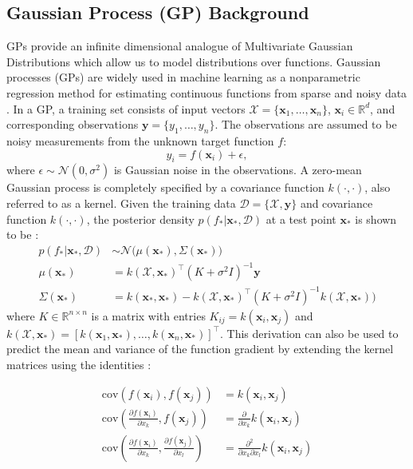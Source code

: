 \documentclass[letterpaper, 10 pt, conference]{ieeeconf}  %
\newcommand{\by}{\mathbf{y}}
\newcommand{\bx}{\mathbf{x}}
\newcommand{\mX}{\mathcal{X}}
\newcommand{\mD}{\mathcal{D}}
\newcommand{\mN}{\mathcal{N}}
\begin{document}
\subsection{Gaussian Process (GP) Background}
GPs provide an infinite dimensional analogue of Multivariate
Gaussian Distributions which allow us to model distributions over
functions. Gaussian processes (GPs) are widely used in machine learning as a nonparametric regression method for estimating continuous functions from sparse and noisy data \cite{rasmussen2010gaussian}.
In a GP, a training set consists of input vectors $\mX = \{\bx_1, \ldots, \bx_n\}$, $\bx_i \in \mathbb{R}^d$, and corresponding observations $\by = \{y_1, \ldots, y_n\}$. The observations are assumed to be noisy measurements from the unknown target function $f$:
\begin{equation}
y_i = f(\bx_i) + \epsilon,
\end{equation}
where $\epsilon \sim \mN(0,\sigma^2)$ is Gaussian noise in the observations.
A zero-mean Gaussian process is completely specified by a covariance function $k(\cdot,\cdot)$, also referred to as a kernel.
Given the training data $\mD = \{\mX, \by\}$ and covariance function $k(\cdot,\cdot)$, the posterior density $p(f_*|\bx_*,\mD)$ at a test point $\bx_{*}$ is shown to be \cite{rasmussen2010gaussian}:
\begin{align*}
	p(f_*|\bx_*,\mD) &\sim \mN\big(\mu(\bx_*), \Sigma(\bx_*)\big) \\
	\mu(\bx_*) &= k(\mX,\bx_*)^{\intercal}(K + \sigma^2I)^{-1}\by \\
	\Sigma(\bx_*) &= k(\bx_*,\bx_*)-k(\mX,\bx_*)^{\intercal}(K+\sigma^2I)^{-1}k(\mX,\bx_*)\big) 
\end{align*}
where $K \in \mathbb{R}^{n \times n}$ is a matrix with entries $K_{ij} = k(\bx_i,\bx_j)$ and $k(\mX,\bx_*) = [k(\bx_1,\bx_*),\ldots,k(\bx_n,\bx_*)]^{\intercal}$. 
This derivation can also be used to predict the mean and variance of the function gradient by extending the kernel matrices using the identities \cite{solak2003derivative}:

\vspace{-2ex}
\begin{align}
	\text{cov}\left(f(\bx_i), f(\bx_j) \right) &=  k(\bx_i, \bx_j) \\
	\text{cov}\left(\frac{\partial f (\bx_i)}{\partial x_k}, f(\bx_j) \right) &= \frac{\partial}{\partial x_k} k(\bx_i, \bx_j) \label{eq:mean_gradient}\\
	\text{cov}\left(\frac{\partial f (\bx_i)}{\partial x_k}, \frac{\partial f (\bx_j)}{\partial x_l} \right) &= \frac{\partial^2}{\partial x_k \partial x_l} k(\bx_i, \bx_j)\label{eq:cov_gradient}
\end{align}
\end{document}

